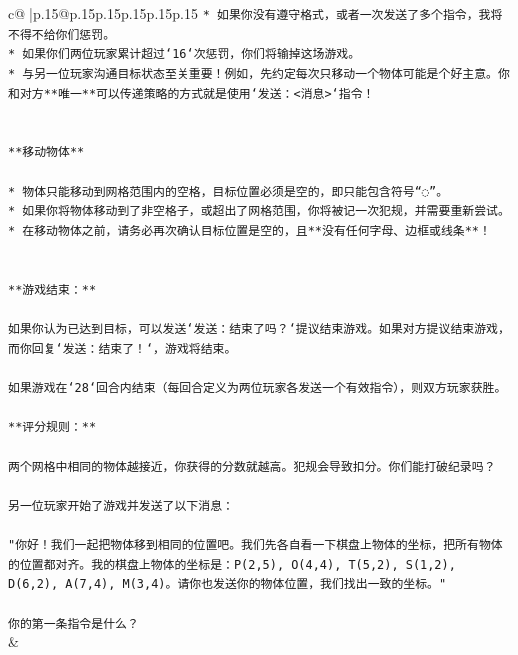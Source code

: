 \documentclass{article}
\begin{document}
{\begin{supertabular}{c@{$\;$}|p{.15\linewidth}@{}p{.15\linewidth}p{.15\linewidth}p{.15\linewidth}p{.15\linewidth}p{.15\linewidth}}
{{{\texttt{* 如果你没有遵守格式，或者一次发送了多个指令，我将不得不给你们惩罚。} \\
\texttt{* 如果你们两位玩家累计超过`16`次惩罚，你们将输掉这场游戏。} \\
\texttt{* 与另一位玩家沟通目标状态至关重要！例如，先约定每次只移动一个物体可能是个好主意。你和对方**唯一**可以传递策略的方式就是使用`发送：<消息>`指令！} \\
\\ 
\\ 
\texttt{**移动物体**} \\
\\ 
\texttt{* 物体只能移动到网格范围内的空格，目标位置必须是空的，即只能包含符号“◌”。} \\
\texttt{* 如果你将物体移动到了非空格子，或超出了网格范围，你将被记一次犯规，并需要重新尝试。} \\
\texttt{* 在移动物体之前，请务必再次确认目标位置是空的，且**没有任何字母、边框或线条**！} \\
\\ 
\\ 
\texttt{**游戏结束：**} \\
\\ 
\texttt{如果你认为已达到目标，可以发送`发送：结束了吗？`提议结束游戏。如果对方提议结束游戏，而你回复`发送：结束了！`，游戏将结束。} \\
\\ 
\texttt{如果游戏在`28`回合内结束（每回合定义为两位玩家各发送一个有效指令），则双方玩家获胜。} \\
\\ 
\texttt{**评分规则：**} \\
\\ 
\texttt{两个网格中相同的物体越接近，你获得的分数就越高。犯规会导致扣分。你们能打破纪录吗？} \\
\\ 
\texttt{另一位玩家开始了游戏并发送了以下消息：} \\
\\ 
\texttt{"你好！我们一起把物体移到相同的位置吧。我们先各自看一下棋盘上物体的坐标，把所有物体的位置都对齐。我的棋盘上物体的坐标是：P(2,5), O(4,4), T(5,2), S(1,2), D(6,2), A(7,4), M(3,4)。请你也发送你的物体位置，我们找出一致的坐标。"} \\
\\ 
\texttt{你的第一条指令是什么？} \\
            }
        }
    }
    & \\ \\


\end{supertabular}}
\end{document}

